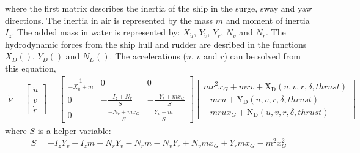 \noindent where the first matrix describes the inertia of the ship in the surge, sway and yaw directions. The inertia in air is represented by the mass $m$ and moment of inertia $I_z$. The added mass in water is represented by: $X_{\dot{u}}$, $Y_{\dot{v}}$, $Y_{\dot{r}}$, $N_{\dot{v}}$ and $N_{\dot{r}}$. The hydrodynamic forces from the ship hull and rudder are desribed in the functions $X_D()$, $Y_D()$ and $N_D()$. The accelerations ($\dot{u}$, $\dot{v}$ and $\dot{r}$) can be solved from this equation,
\begin{equation}\label{equation:02.01_manoeuvring models:eqacc}
\begin{split}\displaystyle \dot{\nu} = \left[\begin{matrix}\dot{u}\\\dot{v}\\\dot{r}\end{matrix}\right] = \left[\begin{matrix}\frac{1}{- X_{\dot{u}} + m} & 0 & 0\\0 & - \frac{- I_{z} + N_{\dot{r}}}{S} & - \frac{- Y_{\dot{r}} + m x_{G}}{S}\\0 & - \frac{- N_{\dot{v}} + m x_{G}}{S} & - \frac{Y_{\dot{v}} - m}{S}\end{matrix}\right] \left[\begin{matrix}m r^{2} x_{G} + m r v + \operatorname{X_{D}}{\left(u,v,r,\delta,thrust \right)}\\- m r u + \operatorname{Y_{D}}{\left(u,v,r,\delta,thrust \right)}\\- m r u x_{G} + \operatorname{N_{D}}{\left(u,v,r,\delta,thrust \right)}\end{matrix}\right]\end{split}
\end{equation}
\sphinxAtStartPar
where \(S\) is a helper variable:
\begin{equation}\label{equation:02.01_manoeuvring models:eq_S}
\begin{split}\displaystyle S = - I_{z} Y_{\dot{v}} + I_{z} m + N_{\dot{r}} Y_{\dot{v}} - N_{\dot{r}} m - N_{\dot{v}} Y_{\dot{r}} + N_{\dot{v}} m x_{G} + Y_{\dot{r}} m x_{G} - m^{2} x_{G}^{2}\end{split}
\end{equation}
\sphinxAtStartPar

